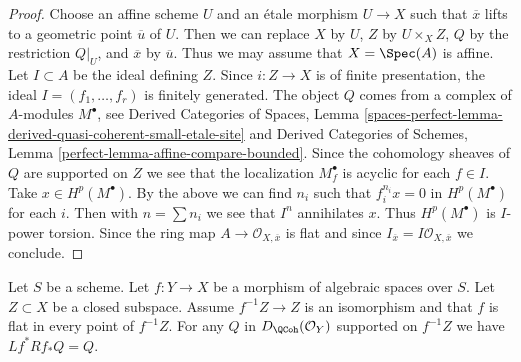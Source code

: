 \begin{proof}
Choose an affine scheme $U$ and an \'etale morphism $U \to X$ such
that $\overline{x}$ lifts to a geometric point $\overline{u}$
of $U$. Then we can replace $X$ by $U$, $Z$ by $U \times_X Z$,
$Q$ by the restriction $Q|_U$, and $\overline{x}$ by $\overline{u}$.
Thus we may assume that $X = \Spec(A)$ is affine. Let $I \subset A$
be the ideal defining $Z$. Since $i : Z \to X$ is of finite presentation,
the ideal $I = (f_1, \ldots, f_r)$ is finitely generated.
The object $Q$ comes from a complex of $A$-modules $M^\bullet$, see
Derived Categories of Spaces, Lemma
\ref{spaces-perfect-lemma-derived-quasi-coherent-small-etale-site}
and
Derived Categories of Schemes, Lemma
\ref{perfect-lemma-affine-compare-bounded}.
Since the cohomology sheaves of $Q$ are supported on $Z$
we see that the localization $M^\bullet_f$ is acyclic for each $f \in I$.
Take $x \in H^p(M^\bullet)$. By the above we can find $n_i$ such
that $f_i^{n_i} x = 0$ in $H^p(M^\bullet)$ for each $i$.
Then with $n = \sum n_i$ we see that $I^n$ annihilates $x$.
Thus $H^p(M^\bullet)$ is $I$-power torsion. Since the ring
map $A \to \mathcal{O}_{X, \overline{x}}$ is flat and since
$I_{\overline{x}} = I\mathcal{O}_{X, \overline{x}}$ we conclude.
\end{proof}

\begin{lemma}
\label{lemma-formal-glueing-on-closed}
Let $S$ be a scheme. Let $f : Y \to X$ be a morphism of algebraic spaces
over $S$. Let $Z \subset X$ be a closed subspace. Assume $f^{-1}Z \to Z$
is an isomorphism and that $f$ is flat in every point of $f^{-1}Z$. For any
$Q$ in $D_\QCoh(\mathcal{O}_Y)$ supported on $f^{-1}Z$ we have $Lf^*Rf_*Q = Q$.
\end{lemma}

